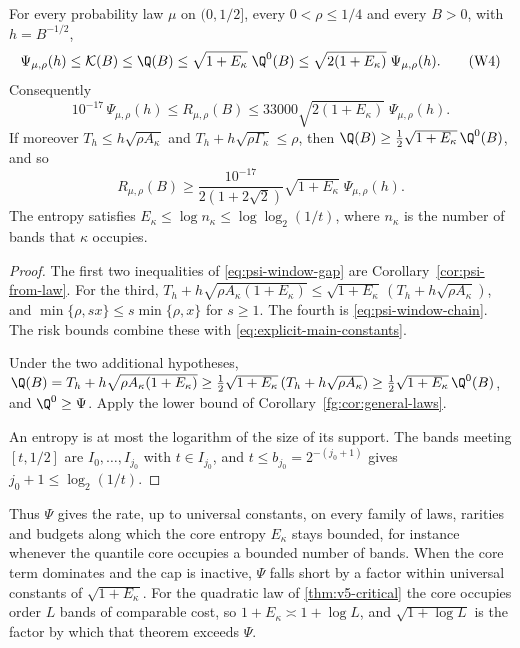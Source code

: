 \begin{theorem}\label{thm:psi-gap}
For every probability law $\mu$ on $(0,1/2]$, every $0<\rho\le1/4$ and
every $B>0$, with $h=B^{-1/2}$,
\[
 \Psi_{\mu,\rho}(h)\le\mathcal K(B)\le\Q(B)
 \le\sqrt{1+E_\kappa}\;\Q^0(B)
 \le\sqrt{2(1+E_\kappa)}\;\Psi_{\mu,\rho}(h).
 \tag{W4}\label{eq:psi-window-gap}
\]
Consequently
\[
 10^{-17}\,\Psi_{\mu,\rho}(h)\le R_{\mu,\rho}(B)
 \le33000\sqrt{2(1+E_\kappa)}\;\Psi_{\mu,\rho}(h).
\]
If moreover $T_h\le h\sqrt{\rho A_\kappa}$ and
$T_h+h\sqrt{\rho\Gamma_\kappa}\le\rho$, then
$\Q(B)\ge\tfrac12\sqrt{1+E_\kappa}\,\Q^0(B)$, and so
\[
 R_{\mu,\rho}(B)\ge\frac{10^{-17}}{2(1+2\sqrt2)}
 \sqrt{1+E_\kappa}\;\Psi_{\mu,\rho}(h).
\]
The entropy satisfies $E_\kappa\le\log n_\kappa\le\log\log_2(1/t)$, where
$n_\kappa$ is the number of bands that $\kappa$ occupies.
\end{theorem}

\begin{proof}
The first two inequalities of \eqref{eq:psi-window-gap} are
Corollary~\ref{cor:psi-from-law}. For the third,
$T_h+h\sqrt{\rho A_\kappa(1+E_\kappa)}
 \le\sqrt{1+E_\kappa}\,(T_h+h\sqrt{\rho A_\kappa})$, and
$\min\{\rho,sx\}\le s\min\{\rho,x\}$ for $s\ge1$. The fourth is
\eqref{eq:psi-window-chain}. The risk bounds combine these with
\eqref{eq:explicit-main-constants}.

Under the two additional hypotheses,
$\Q(B)=T_h+h\sqrt{\rho A_\kappa(1+E_\kappa)}
 \ge\tfrac12\sqrt{1+E_\kappa}\,(T_h+h\sqrt{\rho A_\kappa})
 \ge\tfrac12\sqrt{1+E_\kappa}\,\Q^0(B)$,
and $\Q^0\ge\Psi$. Apply the lower bound of
Corollary~\ref{fg:cor:general-laws}.

An entropy is at most the logarithm of the size of its support. The bands
meeting $[t,1/2]$ are $I_0,\ldots,I_{j_0}$ with $t\in I_{j_0}$, and
$t\le b_{j_0}=2^{-(j_0+1)}$ gives $j_0+1\le\log_2(1/t)$.
\end{proof}

Thus $\Psi$ gives the rate, up to universal constants, on every family of
laws, rarities and budgets along which the core entropy $E_\kappa$ stays
bounded, for instance whenever the quantile core occupies a bounded
number of bands. When the core term dominates and the cap is inactive,
$\Psi$ falls short by a factor within universal constants of
$\sqrt{1+E_\kappa}$. For the
quadratic law of \cref{thm:v5-critical} the core occupies order $L$ bands
of comparable cost, so $1+E_\kappa\asymp1+\log L$, and $\sqrt{1+\log L}$ is
the factor by which that theorem exceeds $\Psi$.

